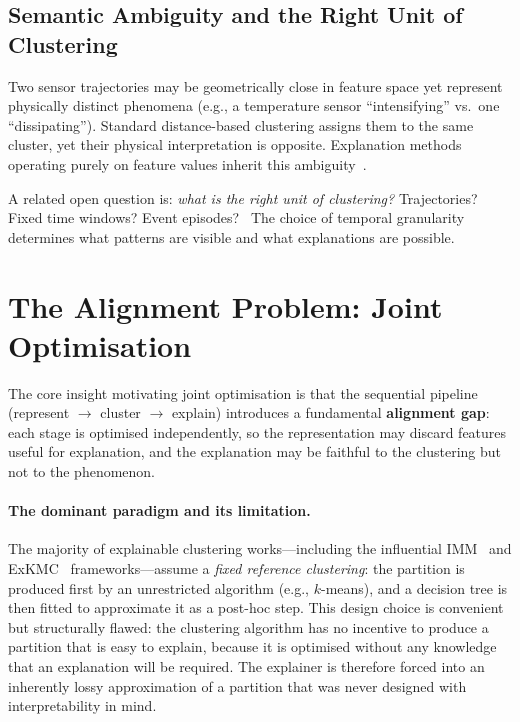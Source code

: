 \documentclass{article}
\theoremstyle{plain}
\theoremstyle{definition}
\theoremstyle{remark}
\begin{document}
\subsection{Semantic Ambiguity and the Right Unit of Clustering}

Two sensor trajectories may be geometrically close in feature space yet
represent physically distinct phenomena (e.g., a temperature sensor
``intensifying'' vs.\ one ``dissipating''). Standard distance-based
clustering assigns them to the same cluster, yet their physical
interpretation is opposite. Explanation methods operating purely on
feature values inherit this ambiguity~\cite{portugal_framework_2024}.

A related open question is: \emph{what is the right unit of clustering?}
Trajectories? Fixed time windows? Event episodes?~\cite{kisilevich_spatio-temporal_nodate}
The choice of temporal granularity determines what patterns are visible
and what explanations are possible.

\section{The Alignment Problem: Joint Optimisation}
\label{sec:alignment}

The core insight motivating joint optimisation is that the sequential
pipeline (represent $\to$ cluster $\to$ explain) introduces a fundamental
\textbf{alignment gap}: each stage is optimised independently, so the
representation may discard features useful for explanation, and the
explanation may be faithful to the clustering but not to the phenomenon.

\paragraph{The dominant paradigm and its limitation.}
The majority of explainable clustering works---including the influential
IMM~\cite{dasgupta_explainable_nodate} and ExKMC~\cite{frost_exkmc_2020}
frameworks---assume a \emph{fixed reference clustering}: the partition is
produced first by an unrestricted algorithm (e.g., $k$-means), and a
decision tree is then fitted to approximate it as a post-hoc step.
This design choice is convenient but structurally flawed: the clustering
algorithm has no incentive to produce a partition that is easy to explain,
because it is optimised without any knowledge that an explanation will
be required. The explainer is therefore forced into an inherently lossy
approximation of a partition that was never designed with interpretability
in mind.
\end{document}

